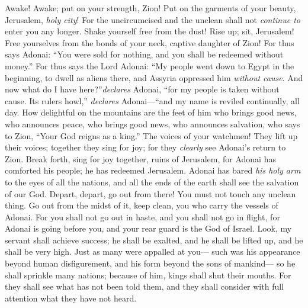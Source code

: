 \begin{biblechapter} %
 Awake! Awake; put on your strength, Zion! 
Put on the garments of your beauty, Jerusalem, \textit{holy city}! 
For the uncircumcised and the unclean shall not \textit{continue to} enter you any longer.
\verse Shake yourself free from the dust! Rise up; sit, Jerusalem! 
Free yourselves from the bonds of your neck, captive daughter of Zion!
\verse For thus says Adonai: “You were sold for nothing, 
and you shall be redeemed without money.”
\verse For thus says the Lord Adonai:
\verse “My people went down to Egypt in the beginning, to dwell as aliens there, and Assyria oppressed him \textit{without cause}.
\verse And now what do I have here?”\textit{declares} Adonai, “for my people is taken without cause. Its rulers howl,” \textit{declares} Adonai—“and my name is reviled continually, all day.
\verse How delightful on the mountains are the feet of him who brings good news, 
who announces peace, who brings good news, who announces salvation, 
who says to Zion, “Your God reigns as a king.”
\verse The voices of your watchmen! They lift up their voices; 
together they sing for joy; 
for they \textit{clearly} see Adonai’s return to Zion.
\verse Break forth, 
sing for joy together, ruins of Jerusalem, 
for Adonai has comforted his people; 
he has redeemed Jerusalem.
\verse Adonai has bared \textit{his holy arm} to the eyes of all the nations, 
and all the ends of the earth shall see the salvation of our God.
\verse Depart, depart, go out from there! You must not touch any unclean thing. 
Go out from the midst of it, keep clean, you who carry the vessels of Adonai.
\verse For you shall not go out in haste, 
and you shall not go in flight, 
for Adonai is going before you, 
and your rear guard is the God of Israel.
 Look, my servant shall achieve success; 
he shall be exalted, 
and he shall be lifted up, 
and he shall be very high.
\verse Just as many were appalled at you— 
such was his appearance beyond human disfigurement, 
and his form beyond the sons of mankind—
\verse so he shall sprinkle many nations; 
because of him, kings shall shut their mouths. 
For they shall see what has not been told them, 
and they shall consider with full attention what they have not heard.
\end{biblechapter}

